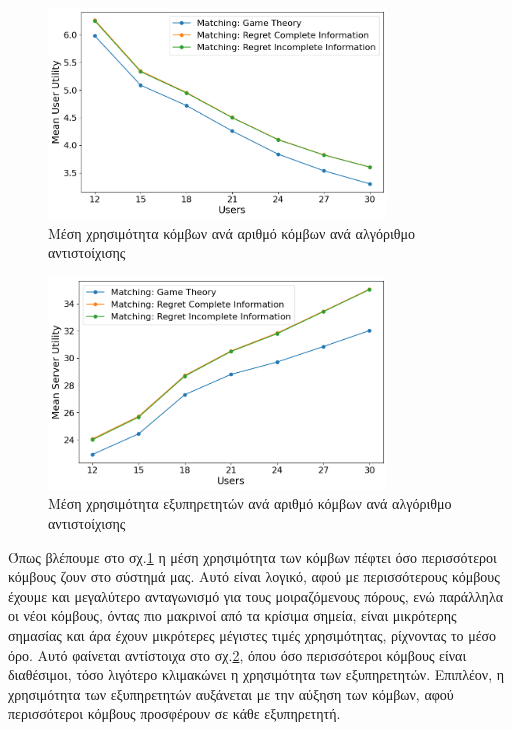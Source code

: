 \begin{figure}[H]
    \centering
    \includegraphics[width=0.8\textwidth]{figures/chapter4/Mean_User_Utility_vs_Users.png}
    \caption{Μέση χρησιμότητα κόμβων ανά αριθμό κόμβων ανά αλγόριθμο αντιστοίχισης}
    \label{fig37}
\end{figure}

\begin{figure}[H]
    \centering
    \includegraphics[width=0.8\textwidth]{figures/chapter4/Mean_Server_Utility_vs_Users.png}
    \caption{Μέση χρησιμότητα εξυπηρετητών ανά αριθμό κόμβων ανά αλγόριθμο αντιστοίχισης}
    \label{fig38}
\end{figure}

\newpage

Όπως βλέπουμε στο σχ.\ref{fig37} η μέση χρησιμότητα των κόμβων πέφτει όσο περισσότεροι κόμβους ζουν στο σύστημά μας. Αυτό είναι λογικό, αφού με περισσότερους κόμβους έχουμε και μεγαλύτερο ανταγωνισμό για τους μοιραζόμενους πόρους, ενώ παράλληλα οι νέοι κόμβους, όντας πιο μακρινοί από τα κρίσιμα σημεία, είναι μικρότερης σημασίας και άρα έχουν μικρότερες μέγιστες τιμές χρησιμότητας, ρίχνοντας το μέσο όρο. Αυτό φαίνεται αντίστοιχα στο σχ.\ref{fig38}, όπου όσο περισσότεροι κόμβους είναι διαθέσιμοι, τόσο λιγότερο κλιμακώνει η χρησιμότητα των εξυπηρετητών. Επιπλέον, η χρησιμότητα των εξυπηρετητών αυξάνεται με την αύξηση των κόμβων, αφού περισσότεροι κόμβους προσφέρουν σε κάθε εξυπηρετητή.

